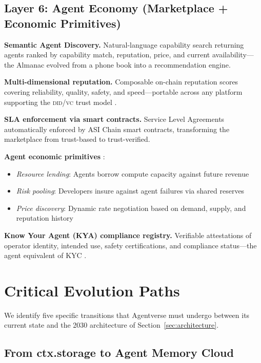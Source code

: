 \documentclass[twoside,11pt]{article}
\begin{document}
\subsection{Layer 6: Agent Economy (Marketplace + Economic Primitives)}
\label{subsec:layer6}

\textbf{Semantic Agent Discovery.} Natural-language capability search returning
agents ranked by capability match, reputation, price, and current
availability---the Almanac evolved from a phone book into a recommendation
engine.

\textbf{Multi-dimensional reputation.} Composable on-chain reputation scores
covering reliability, quality, safety, and speed---portable across any platform
supporting the \textsc{did}/\textsc{vc} trust model \citep{garzon2025agentdid}.

\textbf{SLA enforcement via smart contracts.} Service Level Agreements
automatically enforced by ASI Chain smart contracts, transforming the
marketplace from trust-based to trust-verified.

\textbf{Agent economic primitives} \citep{myerson2007mechanism}:
\begin{itemize}[leftmargin=*]
\item \emph{Resource lending}: Agents borrow compute capacity against future
revenue
\item \emph{Risk pooling}: Developers insure against agent failures via shared
reserves
\item \emph{Price discovery}: Dynamic rate negotiation based on demand, supply,
and reputation history
\end{itemize}

\textbf{Know Your Agent (KYA) compliance registry.}
Verifiable attestations of operator identity, intended use, safety
certifications, and compliance status---the agent equivalent of KYC
\citep{chainup2026kya}.

\section{Critical Evolution Paths}
\label{sec:paths}

We identify five specific transitions that Agentverse must undergo between its
current state and the 2030 architecture of Section~\ref{sec:architecture}.

\subsection{From ctx.storage to Agent Memory Cloud}
\label{subsec:path-memory}
\end{document}
